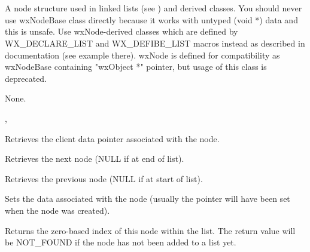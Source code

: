 \section{}\label{wxnode}

A node structure used in linked lists (see ) and
derived classes. You should never use wxNodeBase class directly because it
works with untyped (void *) data and this is unsafe. Use wxNode-derived classes
which are defined by WX\_DECLARE\_LIST and WX\_DEFIBE\_LIST macros instead as
described in  documentation (see example there). wxNode
is defined for compatibility as wxNodeBase containing "wxObject *" pointer, but
usage of this class is deprecated.


None.


, 




Retrieves the client data pointer associated with the node.



Retrieves the next node (NULL if at end of list).



Retrieves the previous node (NULL if at start of list).



Sets the data associated with the node (usually the pointer will have been
set when the node was created).



Returns the zero-based index of this node within the list. The return value
will be NOT\_FOUND if the node has not been added to a list yet.

